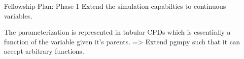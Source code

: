 \documentclass{beamer}
\begin{document}
\begin{frame}{Fellowship Plan: Phase 1}
	Extend the simulation capabilties to continuous variables.


	The parameterization is represented in tabular CPDs which is essentially a function of the variable given it's parents. => Extend pgmpy such that it can accept arbitrary functions.
\end{frame}

\end{document}
